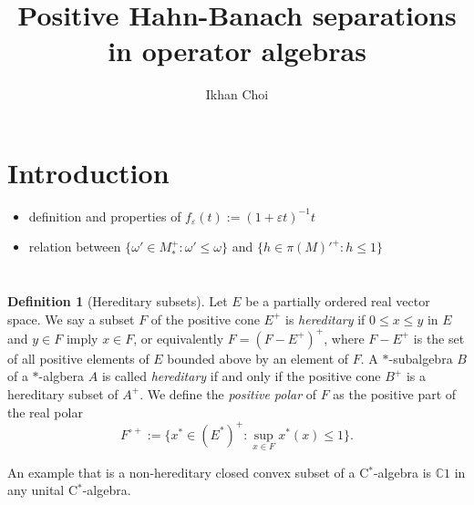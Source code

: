 \documentclass[a4paper]{amsart}
\title{Positive Hahn-Banach separations in operator algebras}
\author{Ikhan Choi}
\newcommand{\e}{\varepsilon}
\theoremstyle{plain}
\theoremstyle{definition}
\newtheorem{defn}[thm]{Definition}
\begin{document}
\begin{abstract}

\end{abstract}

\maketitle

\section{Introduction}






\begin{itemize}
\item definition and properties of $f_\e(t):=(1+\e t)^{-1}t$
\item relation between $\{\omega'\in M_*^+:\omega'\le\omega\}$ and $\{h\in\pi(M)'^+:h\le1\}$
\end{itemize}




\section{}



\begin{defn}[Hereditary subsets]
Let $E$ be a partially ordered real vector space.
We say a subset $F$ of the positive cone $E^+$ is \emph{hereditary} if $0\le x\le y$ in $E$ and $y\in F$ imply $x\in F$, or equivalently $F=(F-E^+)^+$, where $F-E^+$ is the set of all positive elements of $E$ bounded above by an element of $F$.
A $*$-subalgebra $B$ of a $*$-algbera $A$ is called \emph{hereditary} if and only if the positive cone $B^+$ is a hereditary subset of $A^+$.
We define the \emph{positive polar} of $F$ as the positive part of the real polar
\[F^{\circ+}:=\{x^*\in(E^*)^+:\sup_{x\in F}x^*(x)\le1\}.\]
\end{defn}
An example that is a non-hereditary closed convex subset of a C$^*$-algebra is $\mathbb{C}1$ in any unital C$^*$-algebra.
\end{document}
